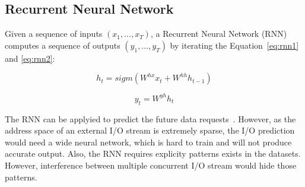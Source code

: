 \subsection{Recurrent Neural Network}

Given a sequence of inputs $(x_1, ..., x_T)$, a Recurrent Neural Network (RNN)~\cite{rumelhart1986learning, werbos1990backpropagation} computes a sequence of outputs $(y_1, ..., y_T)$ by iterating the Equation~\ref{eq:rnn1} and \ref{eq:rnn2}:

\begin{equation}
\label{eq:rnn1}
h_t = sigm(W^{hx}x_t + W^{hh}h_{t-1})
\end{equation}

\begin{equation}
\label{eq:rnn2}
y_t = W^{yh}h_t
\end{equation}

The RNN can be applyied to predict the future data requests~\cite{hashemi2018learning, peled2018towards}.
However, as the address space of an external I/O stream is extremely sparse,
the I/O prediction would need a wide neural network, which is hard to train and will not produce accurate output.
Also, the RNN requires explicity patterns exists in the datasets.
However, interference between multiple concurrent I/O stream would hide those patterns.
